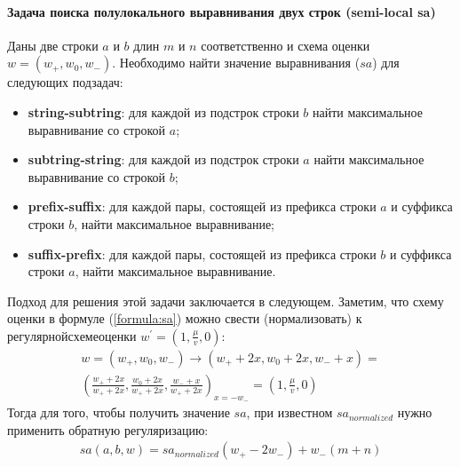 



\paragraph*{Задача поиска полулокального выравнивания двух строк (semi-local sa)}\mbox{}

Даны две строки $a$ и $b$ длин $m$ и $n$ соответственно и схема оценки $w = (w_{+}, w_{0} , w_{-})$. 
Необходимо найти значение выравнивания ($sa$) для следующих подзадач:
\begin{itemize}
    \item \textbf{string-subtring}: для каждой из подстрок строки $b$ найти максимальное выравнивание со строкой $a$; 
    \item \textbf{subtring-string}: для каждой из подстрок строки $a$ найти максимальное выравнивание со строкой $b$; 
    \item \textbf{prefix-suffix}: для каждой пары, состоящей из префикса строки $a$ и суффикса строки $b$, найти максимальное выравнивание; 
    \item \textbf{suffix-prefix}: для каждой пары, состоящей из префикса строки $b$ и суффикса строки $a$, найти максимальное выравнивание. 
\end{itemize}
Подход для решения этой задачи заключается в следующем.
Заметим, что  схему оценки в  формуле (\ref{formula:sa}) можно свести (нормализовать) к $регулярной схеме оценки$ $w^{'} = (1,\frac{\mu}{v} ,0)$:
\begin{equation}\label{weightNormalization}
    \begin{aligned}
    w = (w_{+}, w_{0} , w_{-}) \xrightarrow{} (w_{+} +2x , w_{0} + 2x , w_{-} + x) =\\ ( \frac{w_{+} +2x}{w_{+} +2x} , \frac {w_{0} + 2x}{w_{+} +2x} , \frac{w_{-} + x}{w_{+} +2x})_{x=-w_{-}} = (1,\frac{\mu}{v} ,0) 
    \end{aligned}
\end{equation}
Тогда для того, чтобы получить значение $sa$, при  известном $sa_{normalized}$ нужно применить обратную регуляризацию:
\begin{equation}
    \begin{aligned}
    sa(a,b,w) = sa_{normalized}  (w_{+} - 2w_{-}) +  w_{-} (m + n)
    \end{aligned}
\end{equation}


